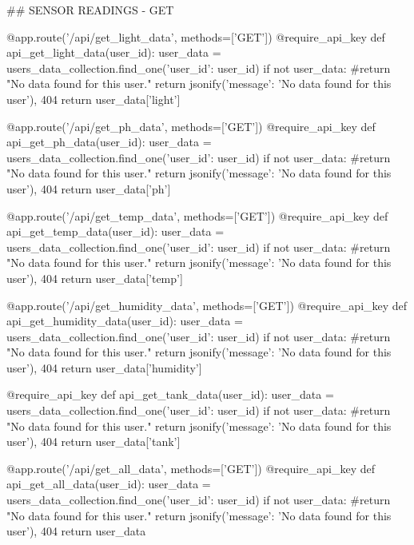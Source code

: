 \documentclass[12pt]{article} %
\begin{document}
\begin{pythoncode}[caption={Flask Backend API Code}]
        ## SENSOR READINGS - GET
    
        @app.route('/api/get_light_data', methods=['GET'])
        @require_api_key
        def api_get_light_data(user_id):
            user_data = users_data_collection.find_one({'user_id': user_id})
            if not user_data:
                #return "No data found for this user."
                return jsonify({'message': 'No data found for this user'}), 404
            return user_data['light']
    
        @app.route('/api/get_ph_data', methods=['GET'])
        @require_api_key
        def api_get_ph_data(user_id):
            user_data = users_data_collection.find_one({'user_id': user_id})
            if not user_data:
                #return "No data found for this user."
                return jsonify({'message': 'No data found for this user'}), 404
            return user_data['ph']
    
        @app.route('/api/get_temp_data', methods=['GET'])
        @require_api_key
        def api_get_temp_data(user_id):
            user_data = users_data_collection.find_one({'user_id': user_id})
            if not user_data:
                #return "No data found for this user."
                return jsonify({'message': 'No data found for this user'}), 404
            return user_data['temp']
    
        @app.route('/api/get_humidity_data', methods=['GET'])
        @require_api_key
        def api_get_humidity_data(user_id):
            user_data = users_data_collection.find_one({'user_id': user_id})
            if not user_data:
                #return "No data found for this user."
                return jsonify({'message': 'No data found for this user'}), 404
            return user_data['humidity']
        
        @require_api_key
        def api_get_tank_data(user_id):
            user_data = users_data_collection.find_one({'user_id': user_id})
            if not user_data:
                #return "No data found for this user."
                return jsonify({'message': 'No data found for this user'}), 404
            return user_data['tank']
    
        @app.route('/api/get_all_data', methods=['GET'])
        @require_api_key
        def api_get_all_data(user_id):
            user_data = users_data_collection.find_one({'user_id': user_id})
            if not user_data:
                #return "No data found for this user."
                return jsonify({'message': 'No data found for this user'}), 404
            return user_data
    

\end{pythoncode}
\end{document}
